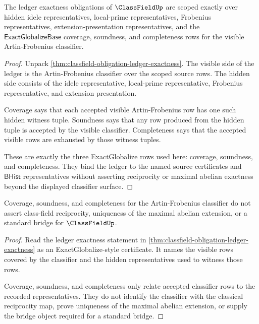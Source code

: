 \begin{theorem}\label{thm:classfield-scoped-ledger-exactness}
The ledger exactness obligations of $\ClassFieldUp$ are scoped exactly over hidden idele representatives, local-prime representatives, Frobenius representatives, extension-presentation representatives, and the $\mathsf{ExactGlobalizeBase}$ coverage, soundness, and completeness rows for the visible Artin-Frobenius classifier.
\end{theorem}

\begin{proof}
Unpack \autoref{thm:classfield-obligation-ledger-exactness}. The visible side of the ledger is the Artin-Frobenius classifier over the scoped source rows. The hidden side consists of the idele representative, local-prime representative, Frobenius representative, and extension presentation.

Coverage says that each accepted visible Artin-Frobenius row has one such hidden witness tuple. Soundness says that any row produced from the hidden tuple is accepted by the visible classifier. Completeness says that the accepted visible rows are exhausted by those witness tuples.

These are exactly the three ExactGlobalize rows used here: coverage, soundness, and completeness. They bind the ledger to the named source certificates and $\mathsf{BHist}$ representatives without asserting reciprocity or maximal abelian exactness beyond the displayed classifier surface.
\end{proof}

\begin{theorem}\label{thm:classfield-reciprocity-boundary}
Coverage, soundness, and completeness for the Artin-Frobenius classifier do not assert class-field reciprocity, uniqueness of the maximal abelian extension, or a standard bridge for $\ClassFieldUp$.
\end{theorem}

\begin{proof}
Read the ledger exactness statement in \autoref{thm:classfield-obligation-ledger-exactness} as an ExactGlobalize-style certificate. It names the visible rows covered by the classifier and the hidden representatives used to witness those rows.

Coverage, soundness, and completeness only relate accepted classifier rows to the recorded representatives. They do not identify the classifier with the classical reciprocity map, prove uniqueness of the maximal abelian extension, or supply the bridge object required for a standard bridge.
\end{proof}

